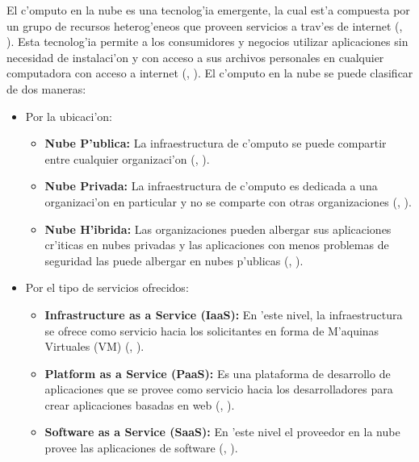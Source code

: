 El c'omputo en la nube es una tecnolog'ia emergente, la cual est'a compuesta por un grupo de recursos heterog'eneos que proveen servicios a trav'es de internet (\citeauthor{agarwal2014efficient}, \citeyear{agarwal2014efficient}).
Esta tecnolog'ia permite a los consumidores y negocios utilizar aplicaciones sin necesidad de instalaci'on y con acceso a sus archivos personales en cualquier computadora con acceso a internet (\citeauthor{ahmed2012advanced}, \citeyear{ahmed2012advanced}). 
El c'omputo en la nube se puede clasificar de dos maneras:
\begin{itemize}
	\item Por la ubicaci'on: 
	\begin{itemize}
		\item \textbf{Nube P'ublica:} La infraestructura de c'omputo se puede compartir entre cualquier organizaci'on (\citeauthor{ahmed2012advanced}, \citeyear{ahmed2012advanced}).
		\item \textbf{Nube Privada:} La infraestructura de c'omputo es dedicada a una organizaci'on en particular y no se comparte con otras organizaciones (\citeauthor{ahmed2012advanced}, \citeyear{ahmed2012advanced}).
		\item \textbf{Nube H'ibrida:} Las organizaciones pueden albergar sus aplicaciones cr'iticas en nubes privadas y las aplicaciones con menos problemas de seguridad las puede albergar en nubes p'ublicas (\citeauthor{ahmed2012advanced}, \citeyear{ahmed2012advanced}).
	\end{itemize}
	\item Por el tipo de servicios ofrecidos: 
	\begin{itemize}
		\item \textbf{Infrastructure as a Service (IaaS):} En 'este nivel, la infraestructura se ofrece como servicio hacia los solicitantes en forma de M'aquinas Virtuales (VM) (\citeauthor{agarwal2014efficient}, \citeyear{agarwal2014efficient}).
		\item \textbf{Platform as a Service (PaaS):} Es una plataforma de desarrollo de aplicaciones que se provee como servicio hacia los desarrolladores para crear aplicaciones basadas en web (\citeauthor{agarwal2014efficient}, \citeyear{agarwal2014efficient}).
		\item \textbf{Software as a Service (SaaS):} En 'este nivel el proveedor en la nube provee las aplicaciones de software (\citeauthor{agarwal2014efficient}, \citeyear{agarwal2014efficient}).
	\end{itemize}
\end{itemize}



